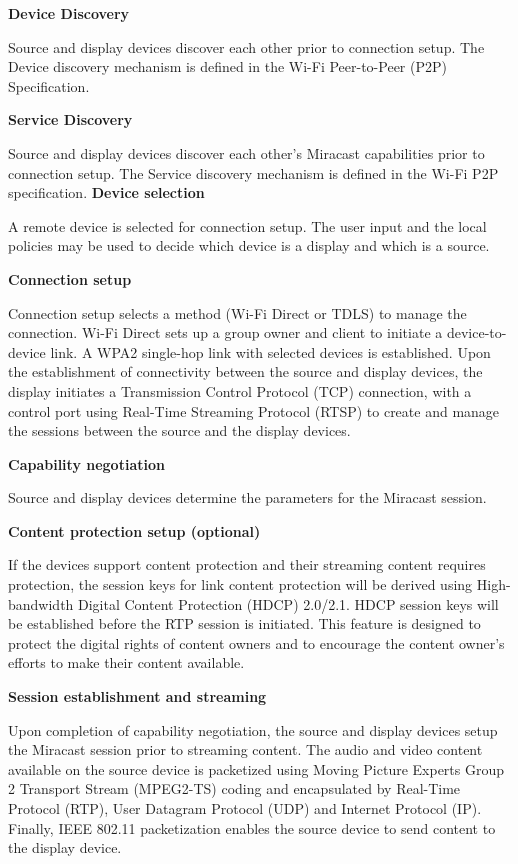 \textbf{Device Discovery}

Source and display devices discover each other prior to connection setup. The Device discovery mechanism is defined in the Wi-Fi Peer-to-Peer (P2P) Specification.

\textbf{Service Discovery}

Source and display devices discover each other's Miracast capabilities prior to connection setup. The Service discovery mechanism is defined in the Wi-Fi P2P specification.
\clearpage
\textbf{Device selection}

A remote device is selected for connection setup. The user input and the local policies may be used to decide which device is a display and which is a source.

\textbf{Connection setup}

Connection setup selects a method (Wi-Fi Direct or TDLS) to manage the connection. Wi-Fi Direct sets up a group owner and client to initiate a device-to-device link. A WPA2 single-hop link with selected devices is established. Upon the establishment of connectivity between the source and display devices, the display initiates a Transmission Control Protocol (TCP) connection, with a control port using Real-Time Streaming Protocol (RTSP) to create and manage the sessions between the source and the display devices.

\textbf{Capability negotiation} 

Source and display devices determine the parameters for the Miracast session. 

\textbf{Content protection setup (optional)}

If the devices support content protection and their streaming content requires
protection, the session keys for link content protection will be derived using High-bandwidth Digital Content Protection (HDCP) 2.0/2.1. HDCP session keys will be established before the RTP session is initiated. This feature is designed to protect the digital rights of content owners and to encourage the content owner's efforts to make their content available.

\textbf{Session establishment and streaming}

Upon completion of capability negotiation, the source and display devices setup the Miracast session prior to streaming content. The audio and video content available on the source device is packetized 
using Moving Picture Experts Group 2 Transport Stream (MPEG2-TS) coding and
encapsulated by Real-Time Protocol (RTP), User Datagram Protocol (UDP) and Internet Protocol (IP). Finally, IEEE 802.11 packetization enables the source device to send content to the display device.

